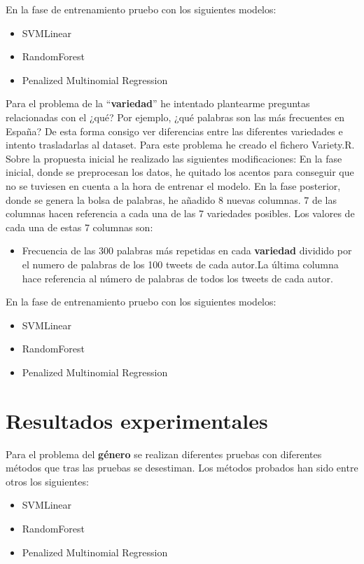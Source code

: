 \documentclass[11pt,a4paper]{article}
\begin{document}
En la fase de entrenamiento pruebo con los siguientes modelos:
\begin{itemize}
 \item SVMLinear
 \item RandomForest
 \item Penalized Multinomial Regression
\end{itemize}

Para el problema de la “\textbf{variedad}” he intentado plantearme preguntas relacionadas con el ¿qu\'e? Por ejemplo, ¿qu\'e palabras son las m\'as frecuentes en Espa\~na? De esta forma consigo ver diferencias entre las diferentes variedades e intento trasladarlas al dataset.\newline
Para este problema he creado el fichero Variety.R.
Sobre la propuesta inicial he realizado las siguientes modificaciones:\newline
En la fase inicial, donde se preprocesan los datos, he quitado los acentos para conseguir que no se tuviesen en cuenta a la hora de entrenar el modelo.
En la fase posterior, donde se genera la bolsa de palabras, he a\~nadido 8 nuevas columnas.
7 de las columnas hacen referencia a cada una de las 7 variedades posibles. \newline
Los valores de cada una de estas 7 columnas son:
\begin{itemize}
 \item Frecuencia de las 300 palabras m\'as repetidas en cada \textbf{variedad} dividido por el numero de palabras de los 100 tweets de cada autor.La \'ultima columna hace referencia al n\'umero de palabras de todos los tweets de cada autor.
\end{itemize}

En la fase de entrenamiento pruebo con los siguientes modelos:
\begin{itemize}
 \item SVMLinear
 \item RandomForest
 \item Penalized Multinomial Regression
\end{itemize}


\section{Resultados experimentales}

Para el problema del \textbf{\textbf{g\'enero}} se realizan diferentes pruebas con diferentes m\'etodos que tras las pruebas se desestiman.\newline
Los m\'etodos probados han sido entre otros los siguientes:
\begin{itemize}
 \item SVMLinear
 \item RandomForest
 \item Penalized Multinomial Regression
\end{itemize}
	
\end{document}
